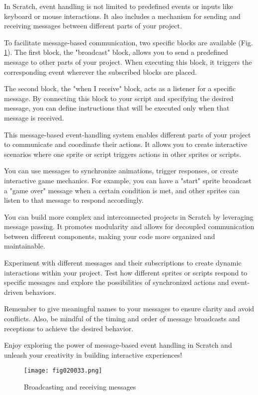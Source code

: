 In Scratch, event handling is not limited to predefined events or inputs like keyboard or mouse interactions. It also includes a mechanism for sending and receiving messages between different parts of your project. 

To facilitate message-based communication, two specific blocks are available (Fig. \ref{fig020033}). The first block, the "broadcast" block, allows you to send a predefined message to other parts of your project. When executing this block, it triggers the corresponding event wherever the subscribed blocks are placed.

The second block, the "when I receive" block, acts as a listener for a specific message. By connecting this block to your script and specifying the desired message, you can define instructions that will be executed only when that message is received.

This message-based event-handling system enables different parts of your project to communicate and coordinate their actions. It allows you to create interactive scenarios where one sprite or script triggers actions in other sprites or scripts.

You can use messages to synchronize animations, trigger responses, or create interactive game mechanics. For example, you can have a "start" sprite broadcast a "game over" message when a certain condition is met, and other sprites can listen to that message to respond accordingly.

You can build more complex and interconnected projects in Scratch by leveraging message passing. It promotes modularity and allows for decoupled communication between different components, making your code more organized and maintainable.

Experiment with different messages and their subscriptions to create dynamic interactions within your project. Test how different sprites or scripts respond to specific messages and explore the possibilities of synchronized actions and event-driven behaviors.

Remember to give meaningful names to your messages to ensure clarity and avoid conflicts. Also, be mindful of the timing and order of message broadcasts and receptions to achieve the desired behavior.

Enjoy exploring the power of message-based event handling in Scratch and unleash your creativity in building interactive experiences!

\begin{figure}[H]
   \centering
   \texttt{[image: fig020033.png]}
   \caption{Broadcasting and receiving messages}
\label{fig020033}
\end{figure}

